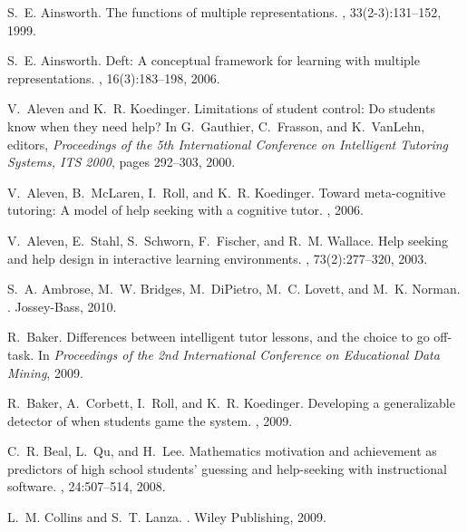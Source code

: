 \documentclass{edm_template}
\begin{document}

%
\begin{thebibliography}{10}

S.~E. Ainsworth.
\newblock The functions of multiple representations.
, 33(2-3):131--152, 1999.

S.~E. Ainsworth.
\newblock Deft: A conceptual framework for learning with multiple
  representations.
, 16(3):183--198, 2006.

V.~Aleven and K.~R. Koedinger.
\newblock Limitations of student control: Do students know when they need help?
\newblock In G.~Gauthier, C.~Frasson, and K.~VanLehn, editors, {\em Proceedings
  of the 5th International Conference on Intelligent Tutoring Systems, ITS
  2000}, pages 292--303, 2000.

V.~Aleven, B.~McLaren, I.~Roll, and K.~R. Koedinger.
\newblock Toward meta-cognitive tutoring: A model of help seeking with a
  cognitive tutor.
,
  2006.

V.~Aleven, E.~Stahl, S.~Schworn, F.~Fischer, and R.~M. Wallace.
\newblock Help seeking and help design in interactive learning environments.
, 73(2):277--320, 2003.

S.~A. Ambrose, M.~W. Bridges, M.~DiPietro, M.~C. Lovett, and M.~K. Norman.
.
\newblock Jossey-Bass, 2010.

R.~Baker.
\newblock Differences between intelligent tutor lessons, and the choice to go
  off-task.
\newblock In {\em Proceedings of the 2nd International Conference on
  Educational Data Mining}, 2009.

R.~Baker, A.~Corbett, I.~Roll, and K.~R. Koedinger.
\newblock Developing a generalizable detector of when students game the system.
, 2009.

C.~R. Beal, L.~Qu, and H.~Lee.
\newblock Mathematics motivation and achievement as predictors of high school
  students' guessing and help-seeking with instructional software.
, 24:507--514, 2008.

L.~M. Collins and S.~T. Lanza.
.
\newblock Wiley Publishing, 2009.


\end{thebibliography}
\end{document}
